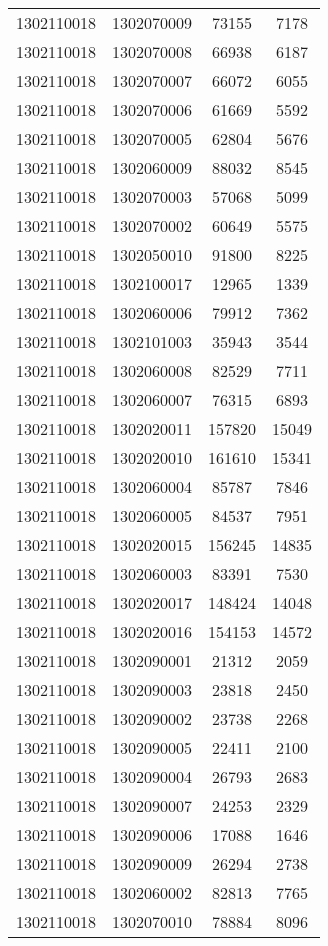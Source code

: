 \begin{longtable}[h]{llcc}
		1302110018 & 1302070009 & 73155 & 7178\\
		1302110018 & 1302070008 & 66938 & 6187\\
		1302110018 & 1302070007 & 66072 & 6055\\
		1302110018 & 1302070006 & 61669 & 5592\\
		1302110018 & 1302070005 & 62804 & 5676\\
		1302110018 & 1302060009 & 88032 & 8545\\
		1302110018 & 1302070003 & 57068 & 5099\\
		1302110018 & 1302070002 & 60649 & 5575\\
		1302110018 & 1302050010 & 91800 & 8225\\
		1302110018 & 1302100017 & 12965 & 1339\\
		1302110018 & 1302060006 & 79912 & 7362\\
		1302110018 & 1302101003 & 35943 & 3544\\
		1302110018 & 1302060008 & 82529 & 7711\\
		1302110018 & 1302060007 & 76315 & 6893\\
		1302110018 & 1302020011 & 157820 & 15049\\
		1302110018 & 1302020010 & 161610 & 15341\\
		1302110018 & 1302060004 & 85787 & 7846\\
		1302110018 & 1302060005 & 84537 & 7951\\
		1302110018 & 1302020015 & 156245 & 14835\\
		1302110018 & 1302060003 & 83391 & 7530\\
		1302110018 & 1302020017 & 148424 & 14048\\
		1302110018 & 1302020016 & 154153 & 14572\\
		1302110018 & 1302090001 & 21312 & 2059\\
		1302110018 & 1302090003 & 23818 & 2450\\
		1302110018 & 1302090002 & 23738 & 2268\\
		1302110018 & 1302090005 & 22411 & 2100\\
		1302110018 & 1302090004 & 26793 & 2683\\
		1302110018 & 1302090007 & 24253 & 2329\\
		1302110018 & 1302090006 & 17088 & 1646\\
		1302110018 & 1302090009 & 26294 & 2738\\
		1302110018 & 1302060002 & 82813 & 7765\\
		1302110018 & 1302070010 & 78884 & 8096\\

\end{longtable}
